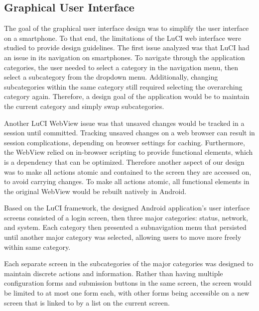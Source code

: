 	\subsection{Graphical User Interface}
	The goal of the graphical user interface design was to simplify the user interface on a smartphone. To that end, the limitations of the LuCI web interface were studied to provide design guidelines. The first issue analyzed was that LuCI had an issue in its navigation on smartphones. To navigate through the application categories, the user needed to select a category in the navigation menu, then select a subcategory from the dropdown menu. Additionally, changing subcategories within the same category still required selecting the overarching category again. Therefore, a design goal of the application would be to maintain the current category and simply swap subcategories.
	
	Another LuCI WebView issue was that unsaved changes would be tracked in a session until committed. Tracking unsaved changes on a web browser can result in session complications, depending on browser settings for caching. Furthermore, the WebView relied on in-browser scripting to provide functional elements, which is a dependency that can be optimized. Therefore another aspect of our design was to make all actions atomic and contained to the screen they are accessed on, to avoid carrying changes. To make all actions atomic, all functional elements in the original WebView would be rebuilt natively in Android.
	
	Based on the LuCI framework, the designed Android application's user interface screens consisted of a login screen, then three major categories: status, network, and system. Each category then presented a subnavigation menu that persisted until another major category was selected, allowing users to move more freely within same category.
	
	Each separate screen in the subcategories of the major categories was designed to maintain discrete actions and information. Rather than having multiple configuration forms and submission buttons in the same screen, the screen would be limited to at most one form each, with other forms being accessible on a new screen that is linked to by a list on the current screen.


